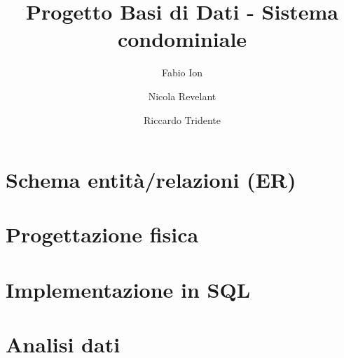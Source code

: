 \documentclass[11pt]{article}
\title{Progetto Basi di Dati - Sistema condominiale}
\author{
	Fabio Ion
	\and
	Nicola Revelant
	\and
	Riccardo Tridente
}
\begin{document}
\maketitle

\tableofcontents



\clearpage

\section{Schema entità/relazioni (ER)}





\section{Progettazione fisica}

\section{Implementazione in SQL}

\section{Analisi dati}
\end{document}
